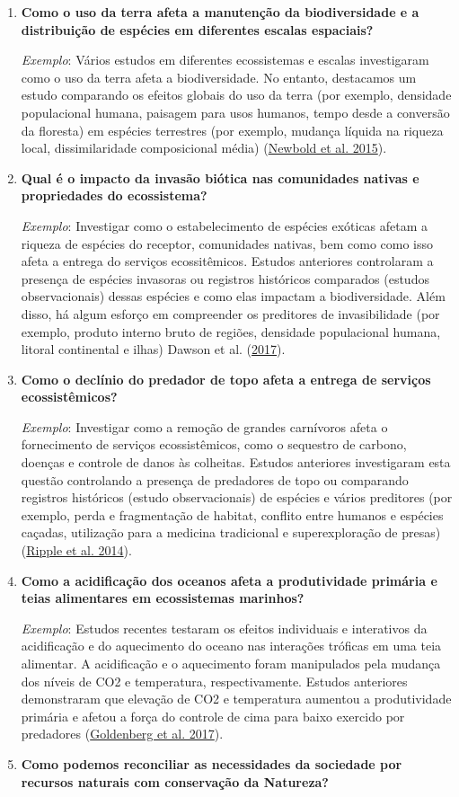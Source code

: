 \documentclass[
]{article}
\begin{document}
\begin{enumerate}
\def\labelenumi{(\alph{enumi})}
\item
  \textbf{Como o uso da terra afeta a manutenção da biodiversidade e a distribuição de espécies em diferentes escalas espaciais?}

  \emph{Exemplo}: Vários estudos em diferentes ecossistemas e escalas investigaram como o uso da terra afeta a biodiversidade. No entanto, destacamos um estudo comparando os efeitos globais do uso da terra (por exemplo, densidade populacional humana, paisagem para usos humanos, tempo desde a conversão da floresta) em espécies terrestres (por exemplo, mudança líquida na riqueza local, dissimilaridade composicional média) (\protect\hyperlink{ref-newbold_global_2015}{Newbold et al. 2015}).
\item
  \textbf{Qual é o impacto da invasão biótica nas comunidades nativas e propriedades do ecossistema?}

  \emph{Exemplo}: Investigar como o estabelecimento de espécies exóticas afetam a riqueza de espécies do receptor, comunidades nativas, bem como como isso afeta a entrega do serviços ecossitêmicos. Estudos anteriores controlaram a presença de espécies invasoras ou registros históricos comparados (estudos observacionais) dessas espécies e como elas impactam a biodiversidade. Além disso, há algum esforço em compreender os preditores de invasibilidade (por exemplo, produto interno bruto de regiões, densidade populacional humana, litoral continental e ilhas) Dawson et al. (\protect\hyperlink{ref-dawson_global_2017}{2017}).
\item
  \textbf{Como o declínio do predador de topo afeta a entrega de serviços ecossistêmicos?}

  \emph{Exemplo}: Investigar como a remoção de grandes carnívoros afeta o fornecimento de serviços ecossistêmicos, como o sequestro de carbono, doenças e controle de danos às colheitas. Estudos anteriores investigaram esta questão controlando a presença de predadores de topo ou comparando registros históricos (estudo observacionais) de espécies e vários preditores (por exemplo, perda e fragmentação de habitat, conflito entre humanos e espécies caçadas, utilização para a medicina tradicional e superexploração de presas) (\protect\hyperlink{ref-ripple_status_2014}{Ripple et al. 2014}).
\item
  \textbf{Como a acidificação dos oceanos afeta a produtividade primária e teias alimentares em ecossistemas marinhos?}

  \emph{Exemplo}: Estudos recentes testaram os efeitos individuais e interativos da acidificação e do aquecimento do oceano nas interações tróficas em uma teia alimentar. A acidificação e o aquecimento foram manipulados pela mudança dos níveis de CO2 e temperatura, respectivamente. Estudos anteriores demonstraram que elevação de CO2 e temperatura aumentou a produtividade primária e afetou a força do controle de cima para baixo exercido por predadores (\protect\hyperlink{ref-goldenberg_boosted_2017}{Goldenberg et al. 2017}).
\item
  \textbf{Como podemos reconciliar as necessidades da sociedade por recursos naturais com conservação da Natureza?}


\end{enumerate}
\end{document}

